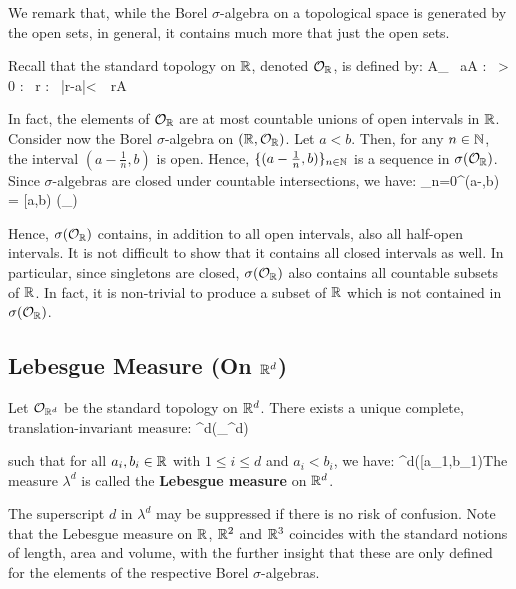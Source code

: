 We remark that, while the Borel $\sigma$-algebra on a topological space is generated by the open sets, in general, it
contains much more that just the open sets.

\be
Recall that the standard topology on $\mathbb{R}$, denoted $\mathcal{O}_{\mathbb{R}}$, is defined by:
\bse
A\in {}_{\R} \quad \Leftrightarrow \quad \forall \, a\in A : \exists \, \varepsilon > 0 : \forall \, r \in
\R : \ |r-a|<\varepsilon \, \Rightarrow\, r\in A
\ese

In fact, the elements of $\mathcal{O}_{\mathbb{R}}$ are at most countable unions of open intervals in $\mathbb{R}$. Consider now the
Borel $\sigma$-algebra on $(\mathbb{R},\mathcal{O}_{\mathbb{R}})$. Let $a<b$. Then, for any $n\in \mathbb{N}$, the interval $(a-\tfrac{1}{n},
b)$ is open. Hence, $\{(a-\tfrac{1}{n},b)\}_{n\in \mathbb{N}}$ is a sequence in $\sigma(\mathcal{O}_{\mathbb{R}})$. Since
$\sigma$-algebras are closed under countable intersections, we have:
\bse
\bigcap_{n=0}^{\infty}(a-,b) = [a,b) \in \sigma(_{\R})
\ese

Hence, $\sigma(\mathcal{O}_{\mathbb{R}})$ contains, in addition to all open intervals, also all half-open intervals. It is
not difficult to show that it contains all closed intervals as well. In particular, since singletons are closed,
$\sigma(\mathcal{O}_{\mathbb{R}})$ also contains all countable subsets of $\mathbb{R}$. In fact, it is non-trivial to produce a
subset of $\mathbb{R}$ which is not contained in $\sigma(\mathcal{O}_{\mathbb{R}})$.
\ee

\subsection{Lebesgue Measure (On $\mathbb{R}^d$)}

\bt[]
Let $\mathcal{O}_{\mathbb{R}^d}$ be the standard topology on $\mathbb{R}^d$. There exists a unique complete, translation-invariant
measure:
\bse
\lambda^d\cl\sigma(_{\R^d})\to[0,\infty]
\ese

such that for all $a_i,b_i\in\mathbb{R}$ with $1\leq i\leq d$ and $a_i<b_i$, we have:
\bse
\lambda^d\bigl([a_1,b_1)\times\cdots\times[a_d,b_d)\bigr) = \prod_{i=1}^d(b_i-a_i)
\ese
\et

\bd [Lebesgue Measure]
The measure $\lambda^d$ is called the \textbf{Lebesgue measure} on $\mathbb{R}^d$.
\ed

The superscript $d$ in $\lambda^d$ may be suppressed if there is no risk of confusion. Note that the Lebesgue measure
on $\mathbb{R}$, $\mathbb{R}^2$ and $\mathbb{R}^3$ coincides with the standard notions of length, area and volume, with the further insight
that these are only defined for the elements of the respective Borel $\sigma$-algebras.

